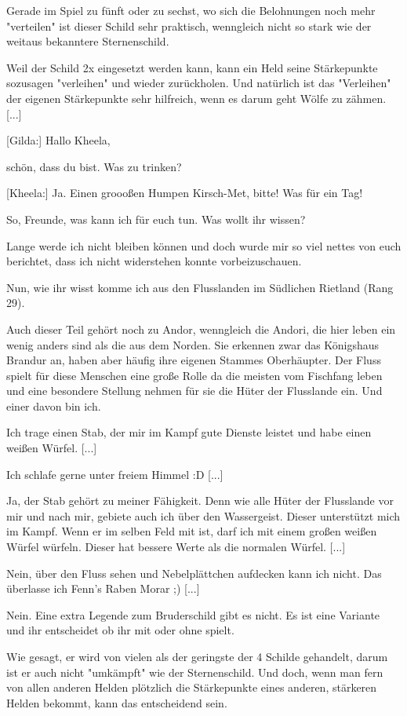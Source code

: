 \documentclass[10pt, a4paper, oneside]{book}
\begin{document}
\begin{multicols}{2}
Gerade im Spiel zu fünft oder zu sechst, wo sich die Belohnungen noch mehr "verteilen" ist dieser Schild sehr praktisch, wenngleich nicht so stark wie der weitaus bekanntere Sternenschild.

Weil der Schild 2x eingesetzt werden kann, kann ein Held seine Stärkepunkte sozusagen "verleihen" und wieder zurückholen. Und natürlich ist das "Verleihen" der eigenen Stärkepunkte sehr hilfreich, wenn es darum geht Wölfe zu zähmen. [...]

[Gilda:] Hallo Kheela,

schön, dass du bist. Was zu trinken?

[Kheela:] Ja. Einen groooßen Humpen Kirsch-Met, bitte! Was für ein Tag!

So, Freunde, was kann ich für euch tun. Was wollt ihr wissen?

Lange werde ich nicht bleiben können und doch wurde mir so viel nettes von euch berichtet, dass ich nicht widerstehen konnte vorbeizuschauen.

Nun, wie ihr wisst komme ich aus den Flusslanden im Südlichen Rietland (Rang 29).

Auch dieser Teil gehört noch zu Andor, wenngleich die Andori, die hier leben ein wenig anders sind als die aus dem Norden. Sie erkennen zwar das Königshaus Brandur an, haben aber häufig ihre eigenen Stammes Oberhäupter. Der Fluss spielt für diese Menschen eine große Rolle da die meisten vom Fischfang leben und eine besondere Stellung nehmen für sie die Hüter der Flusslande ein. Und einer davon bin ich.

Ich trage einen Stab, der mir im Kampf gute Dienste leistet und habe einen weißen Würfel. [...]

Ich schlafe gerne unter freiem Himmel :D [...]

Ja, der Stab gehört zu meiner Fähigkeit. Denn wie alle Hüter der Flusslande vor mir und nach mir, gebiete auch ich über den Wassergeist. Dieser unterstützt mich im Kampf. Wenn er im selben Feld mit ist, darf ich mit einem großen weißen Würfel würfeln. Dieser hat bessere Werte als die normalen Würfel. [...]

Nein, über den Fluss sehen und Nebelplättchen aufdecken kann ich nicht. Das überlasse ich Fenn's Raben Morar ;) [...]

Nein. Eine extra Legende zum Bruderschild gibt es nicht. Es ist eine Variante und ihr entscheidet ob ihr mit oder ohne spielt.

Wie gesagt, er wird von vielen als der geringste der 4 Schilde gehandelt, darum ist er auch nicht "umkämpft" wie der Sternenschild. Und doch, wenn man fern von allen anderen Helden plötzlich die Stärkepunkte eines anderen, stärkeren Helden bekommt, kann das entscheidend sein.


\end{multicols}
\end{document}
